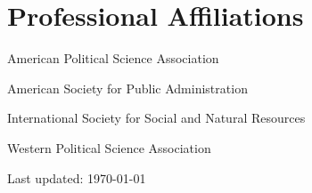 \documentclass[11pt,letterpaper]{article}
\renewenvironment{itemize}{
  \begin{list}{}{
    \setlength{\leftmargin}{1.5em}
    \setlength{\itemsep}{0.25em}
    \setlength{\parskip}{0pt}
    \setlength{\parsep}{0.25em}
  }
}{
  \end{list}
}
\begin{document}
\section*{Professional Affiliations}
\begin{itemize}
	\item American Political Science Association
	\item American Society for Public Administration
	\item International Society for Social and Natural Resources
	\item Western Political Science Association
\end{itemize}


%		
%		
%			

	
\vspace{2in}
\begin{center}
  \begin{small}
    Last updated: \today
      \end{small}
\end{center}
\end{document}
